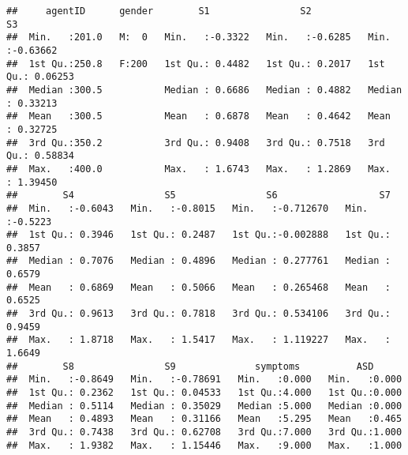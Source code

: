 \documentclass[]{article}
\newenvironment{Shaded}{\begin{snugshade}}{\end{snugshade}}
\newcommand{\KeywordTok}[1]{\textcolor[rgb]{0.13,0.29,0.53}{\textbf{#1}}}
\newcommand{\DecValTok}[1]{\textcolor[rgb]{0.00,0.00,0.81}{#1}}
\newcommand{\StringTok}[1]{\textcolor[rgb]{0.31,0.60,0.02}{#1}}
\newcommand{\CommentTok}[1]{\textcolor[rgb]{0.56,0.35,0.01}{\textit{#1}}}
\newcommand{\OperatorTok}[1]{\textcolor[rgb]{0.81,0.36,0.00}{\textbf{#1}}}
\newcommand{\NormalTok}[1]{#1}
\begin{document}
\begin{verbatim}
##     agentID      gender        S1                S2                S3          
##  Min.   :201.0   M:  0   Min.   :-0.3322   Min.   :-0.6285   Min.   :-0.63662  
##  1st Qu.:250.8   F:200   1st Qu.: 0.4482   1st Qu.: 0.2017   1st Qu.: 0.06253  
##  Median :300.5           Median : 0.6686   Median : 0.4882   Median : 0.33213  
##  Mean   :300.5           Mean   : 0.6878   Mean   : 0.4642   Mean   : 0.32725  
##  3rd Qu.:350.2           3rd Qu.: 0.9408   3rd Qu.: 0.7518   3rd Qu.: 0.58834  
##  Max.   :400.0           Max.   : 1.6743   Max.   : 1.2869   Max.   : 1.39450  
##        S4                S5                S6                  S7         
##  Min.   :-0.6043   Min.   :-0.8015   Min.   :-0.712670   Min.   :-0.5223  
##  1st Qu.: 0.3946   1st Qu.: 0.2487   1st Qu.:-0.002888   1st Qu.: 0.3857  
##  Median : 0.7076   Median : 0.4896   Median : 0.277761   Median : 0.6579  
##  Mean   : 0.6869   Mean   : 0.5066   Mean   : 0.265468   Mean   : 0.6525  
##  3rd Qu.: 0.9613   3rd Qu.: 0.7818   3rd Qu.: 0.534106   3rd Qu.: 0.9459  
##  Max.   : 1.8718   Max.   : 1.5417   Max.   : 1.119227   Max.   : 1.6649  
##        S8                S9              symptoms          ASD       
##  Min.   :-0.8649   Min.   :-0.78691   Min.   :0.000   Min.   :0.000  
##  1st Qu.: 0.2362   1st Qu.: 0.04533   1st Qu.:4.000   1st Qu.:0.000  
##  Median : 0.5114   Median : 0.35029   Median :5.000   Median :0.000  
##  Mean   : 0.4893   Mean   : 0.31166   Mean   :5.295   Mean   :0.465  
##  3rd Qu.: 0.7438   3rd Qu.: 0.62708   3rd Qu.:7.000   3rd Qu.:1.000  
##  Max.   : 1.9382   Max.   : 1.15446   Max.   :9.000   Max.   :1.000
\end{verbatim}

\begin{Shaded}
\end{Shaded}
\end{document}
